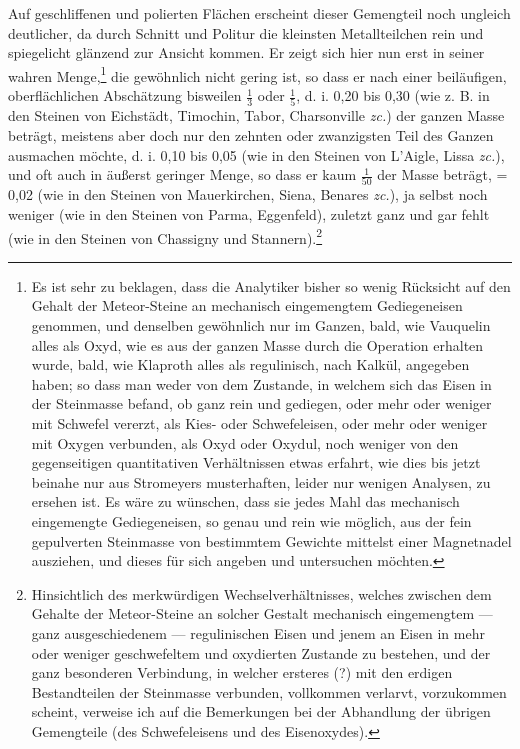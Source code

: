 \documentclass[a4paper, 11pt, oneside, german]{article}
\begin{document}
Auf geschliffenen und polierten Flächen erscheint dieser Gemengteil noch ungleich deutlicher, da durch Schnitt und Politur die kleinsten Metallteilchen rein und spiegelicht glänzend zur Ansicht kommen. Er zeigt sich hier nun erst in seiner wahren Menge,\footnote{Es ist sehr zu beklagen, dass die Analytiker bisher so wenig Rücksicht auf den Gehalt der Meteor-Steine an mechanisch eingemengtem Gediegeneisen genommen, und denselben gewöhnlich nur im Ganzen, bald, wie Vauquelin alles als Oxyd, wie es aus der ganzen Masse durch die Operation erhalten wurde, bald, wie Klaproth alles als regulinisch, nach Kalkül, angegeben haben; so dass man weder von dem Zustande, in welchem sich das Eisen in der Steinmasse befand, ob ganz rein und gediegen, oder mehr oder weniger mit Schwefel vererzt, als Kies- oder Schwefeleisen, oder mehr oder weniger mit Oxygen verbunden, als Oxyd oder Oxydul, noch weniger von den gegenseitigen quantitativen Verhältnissen etwas erfahrt, wie dies bis jetzt beinahe nur aus Stromeyers musterhaften, leider nur wenigen Analysen, zu ersehen ist. Es wäre zu wünschen, dass sie jedes Mahl das mechanisch eingemengte Gediegeneisen, so genau und rein wie möglich, aus der fein gepulverten Steinmasse von bestimmtem Gewichte mittelst einer Magnetnadel ausziehen, und dieses für sich angeben und untersuchen möchten.} die gewöhnlich nicht gering ist, so dass er nach einer beiläufigen, oberflächlichen Abschätzung bisweilen $\frac{1}{3}$ oder $\frac{1}{5}$, d. i. 0,20 bis 0,30 (wie z. B. in den Steinen von Eichstädt, Timochin, Tabor, Charsonville \emph{zc.}) der ganzen Masse beträgt, meistens aber doch nur den zehnten oder zwanzigsten Teil des Ganzen ausmachen möchte, d. i. 0,10 bis 0,05 (wie in den Steinen von L'Aigle, Lissa \emph{zc.}), und oft auch in äußerst geringer Menge, so dass er kaum $\frac{1}{50}$ der Masse beträgt, = 0,02 (wie in den Steinen von Mauerkirchen, Siena, Benares \emph{zc.}), ja selbst noch weniger (wie in den Steinen von Parma, Eggenfeld), zuletzt ganz und gar fehlt (wie in den Steinen von Chassigny und Stannern).\footnote{Hinsichtlich des merkwürdigen Wechselverhältnisses, welches zwischen dem Gehalte der Meteor-Steine an solcher Gestalt mechanisch eingemengtem --- ganz ausgeschiedenem --- regulinischen Eisen und jenem an Eisen in mehr oder weniger geschwefeltem und oxydierten Zustande zu bestehen, und der ganz besonderen Verbindung, in welcher ersteres (?) mit den erdigen Bestandteilen der Steinmasse verbunden, vollkommen verlarvt, vorzukommen scheint, verweise ich auf die Bemerkungen bei der Abhandlung der übrigen Gemengteile (des Schwefeleisens und des Eisenoxydes).}
\end{document}
